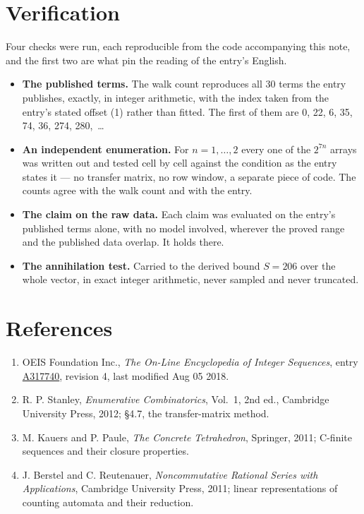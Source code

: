 \documentclass[11pt]{article}
\theoremstyle{definition}
\begin{document}
\section{Verification}

Four checks were run, each reproducible from the code accompanying this note, and the first two are what pin the reading of the entry's English.

\begin{itemize}

\item {\bfseries The published terms.} The walk count reproduces all 30 terms the entry publishes, exactly, in integer arithmetic, with the index taken from the entry's stated offset (1) rather than fitted. The first of them are 0, 22, 6, 35, 74, 36, 274, 280,~\dots

\item {\bfseries An independent enumeration.} For $n = 1,\dots,2$ every one of the $2^{7n}$ arrays was written out and tested cell by cell against the condition as the entry states it --- no transfer matrix, no row window, a separate piece of code. The counts agree with the walk count and with the entry.

\item {\bfseries The claim on the raw data.} Each claim was evaluated on the entry's published terms alone, with no model involved, wherever the proved range and the published data overlap. It holds there.

\item {\bfseries The annihilation test.} Carried to the derived bound $S = 206$ over the whole vector, in exact integer arithmetic, never sampled and never truncated.

\end{itemize}

\section{References}

\begin{enumerate}

\item OEIS Foundation Inc., \emph{The On-Line Encyclopedia of Integer Sequences}, entry \href{https://oeis.org/A317740}{A317740}, revision 4, last modified Aug 05 2018.

\item R. P. Stanley, \emph{Enumerative Combinatorics}, Vol.~1, 2nd ed., Cambridge University Press, 2012; \S4.7, the transfer-matrix method.

\item M. Kauers and P. Paule, \emph{The Concrete Tetrahedron}, Springer, 2011; C-finite sequences and their closure properties.

\item J. Berstel and C. Reutenauer, \emph{Noncommutative Rational Series with Applications}, Cambridge University Press, 2011; linear representations of counting automata and their reduction.

\end{enumerate}
\end{document}

